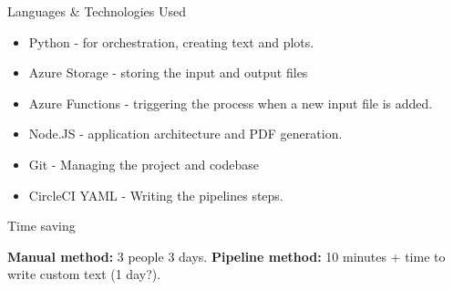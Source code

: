 \documentclass[aspectratio=169]{beamer}
\begin{document}
\begin{frame}{Languages \& Technologies Used}
\begin{itemize}
	\item Python - for orchestration, creating text and plots.
	\item Azure Storage - storing the input and output files
	\item Azure Functions - triggering the process when a new input file is added.
	\item Node.JS - application architecture and PDF generation.
	\item Git - Managing the project and codebase
	\item CircleCI YAML - Writing the pipelines steps.
\end{itemize}	

\begin{block}{Time saving}

\textbf{Manual method:} 3 people 3 days. \newline
\textbf{Pipeline method:} 10 minutes + time to write custom text (1 day?).

\end{block}


\end{frame}



	
\end{document}
